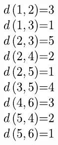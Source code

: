 \begin{savenotes}
\begin{figure}[!htbp]
\begin{subfigure}[b]{0.09\textwidth}
			\includegraphics[width=\textwidth]{Chapter_I/ADJACENCY-MATRIX-Example/b.pdf}

\end{subfigure}
\end{figure}
\end{savenotes}
